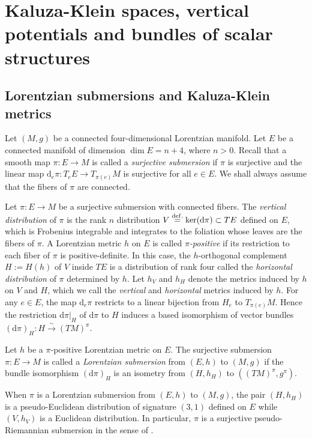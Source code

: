 \documentclass[10pt, cmp, numbook, final, a4paper]{svjour}
\newcommand{\eqdef}{\stackrel{{\rm def.}}{=}}
\def\dd{\mathrm{d}}
\begin{document}
\section{Kaluza-Klein spaces, vertical potentials and bundles of scalar structures}
\label{sec:KK}


\subsection{Lorentzian submersions and Kaluza-Klein metrics} 

Let $(M,g)$ be a connected four-dimensional Lorentzian manifold. Let
$E$ be a connected manifold of dimension $\dim E=n+4$, where $n>0$. 
Recall that a smooth map $\pi:E\rightarrow M$ is called a {\em
  surjective submersion} if $\pi$ is surjective and the linear map
$\dd_e \pi\colon T_e E\rightarrow T_{\pi(e)} M$ is surjective for all
$e\in E$. We shall always assume that the fibers of $\pi$ are
connected.

Let $\pi:E\rightarrow M$ be a surjective submersion with connected fibers.  The
{\em vertical distribution} of $\pi$ is the rank $n$ distribution
$V\eqdef \ker (\dd \pi)\subset T E$ defined on $E$, which is Frobenius
integrable and integrates to the foliation whose leaves are the fibers
of $\pi$. A Lorentzian metric $h$ on $E$ is called {\em
  $\pi$-positive} if its restriction to each fiber of $\pi$ is
positive-definite. In this case, the $h$-orthogonal complement
$H:=H(h)$ of $V$ inside $TE$ is a distribution of rank four called the
{\em horizontal distribution} of $\pi$ determined by $h$. Let $h_V$
and $h_H$ denote the metrics induced by $h$ on $V$ and $H$, which we
call the {\em vertical} and {\em horizontal} metrics induced by
$h$. For any $e\in E$, the map $\dd_e \pi$ restricts to a linear
bijection from $H_e$ to $T_{\pi(e)}M$. Hence the restriction
$\dd\pi|_H$ of $\dd \pi$ to $H$ induces a based isomorphism of vector
bundles $(\dd\pi)_H\colon H\stackrel{\sim}{\rightarrow} (TM)^\pi$.

\begin{definition}
Let $h$ be a $\pi$-positive Lorentzian metric on $E$. 
The surjective submersion $\pi:E\rightarrow M$ is called a {\em
  Lorentzian submersion} from $(E,h)$ to $(M,g)$ if the bundle
isomorphism $(\dd\pi)_H$ is an isometry from $(H,h_H)$ to
$((TM)^\pi,g^\pi)$. 
\end{definition}

\noindent 
When $\pi$ is a Lorentzian submersion from $(E,h)$ to $(M,g)$, the
pair $(H,h_H)$ is a pseudo-Euclidean distribution of signature $(3,1)$
defined on $E$ while $(V,h_V)$ is a Euclidean distribution. In
particular, $\pi$ is a surjective pseudo-Riemannian submersion in the
sense of \cite{ONeillBook}.
\end{document}
